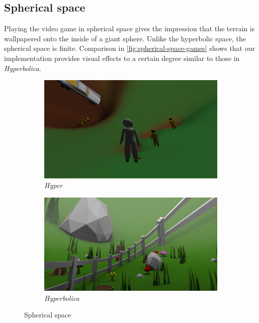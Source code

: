 \subsection{Spherical space}
Playing the video game in spherical space gives the impression that the terrain is wallpapered onto the inside of a giant sphere.
Unlike the hyperbolic space, the spherical space is finite.
Comparison in \autoref{fig:spherical-space-games} shows that our implementation provides visual effects to a certain degree similar to those in \textit{Hyperbolica}.
\begin{figure}[!htb]
    \centering
    \begin{subfigure}[b]{0.475\textwidth}
        \centering
        \includegraphics[width=\textwidth]{chapters/results/sections/non_euclidean/resources/spherical-in-hyper.png}
        \caption[]%
        {{\small \textit{Hyper}}}
        \label{fig:spherical-space-games-hyper}
    \end{subfigure}
    \hfill
    \begin{subfigure}[b]{0.5\textwidth}
        \centering
        \includegraphics[width=\textwidth]{chapters/results/sections/non_euclidean/resources/hyperbolica-1.png}
        \caption[]%
        {{\small \textit{Hyperbolica \cite{Hyperbolica-Spherical}}}}
        \label{fig:spherical-space-games-hyperbolica}
    \end{subfigure}
    \caption[]
    {\small Spherical space}
    \label{fig:spherical-space-games}
\end{figure}

